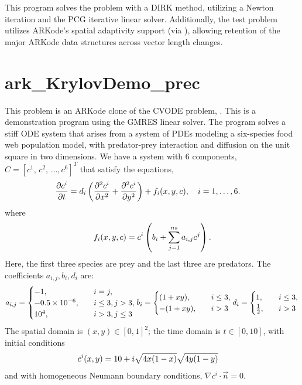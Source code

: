 \documentclass[letterpaper,10pt,english]{sphinxmanual}
\begin{document}
This program solves the problem with a DIRK method, utilizing a Newton
iteration and the PCG iterative linear solver.  Additionally, the test
problem utilizes ARKode's spatial adaptivity support (via
), allowing retention of the major ARKode data
structures across vector length changes.


\section{ark\_KrylovDemo\_prec}
\label{c_serial:ark-krylovdemo-prec}\label{c_serial:id30}
This problem is an ARKode clone of the CVODE problem,
.  This is a demonstration program using the
GMRES linear solver.  The program solves a stiff ODE system that arises
from a system of PDEs modeling a six-species food web population
model, with predator-prey interaction and diffusion on the unit square
in two dimensions. We have a system with 6 components, \(C =
[c^1,\, c^2,\,\ldots, c^6]^T\) that satisfy the equations,
\begin{gather}
\begin{split}\frac{\partial c^i}{\partial t} &= d_i \left(\frac{\partial^2 c^i}{\partial
   x^2} + \frac{\partial^2 c^i}{\partial y^2}\right) +
   f_i(x,y,c),\quad i=1,\ldots,6.\end{split}\notag
\end{gather}
where
\begin{gather}
\begin{split}f_i(x,y,c) = c^i\left( b_i + \sum_{j=1}^{ns} a_{i,j} c^j\right).\end{split}\notag
\end{gather}
Here, the first three species are prey and the last three are
predators.  The coefficients \(a_{i,j}, b_i, d_i\) are:
\begin{gather}
\begin{split}a_{i,j} = \begin{cases}
            -1, \quad & i=j,\\
            -0.5\times10^{-6}, \quad & i\le 3, j>3, \\
             10^4, \quad & i>3, j\le3
          \end{cases}
b_i = \begin{cases}
         (1+xy), \quad & i\le 3,\\
        -(1+xy), \quad & i>3
      \end{cases}
d_i = \begin{cases}
         1, \quad & i\le 3,\\
         \frac12, \quad & i>3
      \end{cases}\end{split}\notag
\end{gather}
The spatial domain is \((x,y) \in [0, 1]^2\); the time domain is
\(t \in [0,10]\), with initial conditions
\begin{gather}
\begin{split}c^i(x,y) &=  10 + i \sqrt{4x(1-x)}\sqrt{4y(1-y)}\end{split}\notag
\end{gather}
and with homogeneous Neumann boundary conditions,
\(\nabla c^i \cdot \vec{n} = 0\).
\end{document}
